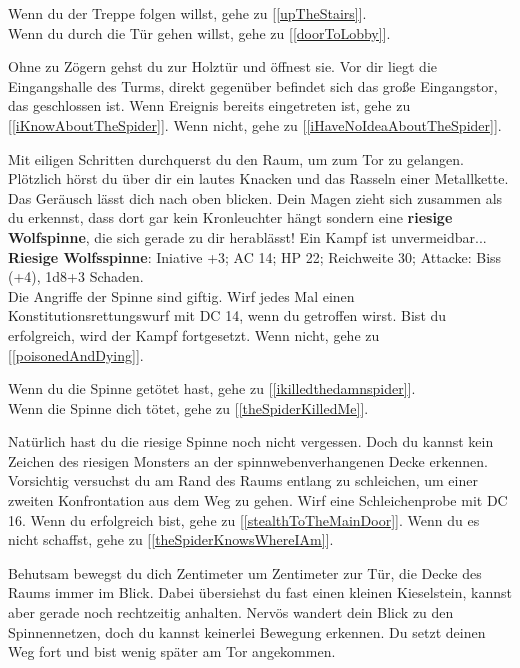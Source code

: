Wenn du der Treppe folgen willst, gehe zu [\ref{upTheStairs}].
\\Wenn du durch die Tür gehen willst, gehe zu [\ref{doorToLobby}].


Ohne zu Zögern gehst du zur Holztür und öffnest sie. Vor dir liegt die Eingangshalle des Turms, direkt gegenüber befindet sich das große Eingangstor, das geschlossen ist. Wenn Ereignis  bereits eingetreten ist, gehe zu [\ref{iKnowAboutTheSpider}].
Wenn nicht, gehe zu [\ref{iHaveNoIdeaAboutTheSpider}].


Mit eiligen Schritten durchquerst du den Raum, um zum Tor zu gelangen. Plötzlich hörst du über dir ein lautes Knacken und das Rasseln einer Metallkette.
Das Geräusch lässt dich nach oben blicken. Dein Magen zieht sich zusammen als du erkennst, dass dort gar kein Kronleuchter hängt sondern eine \textbf{riesige Wolfspinne}, die sich gerade zu dir herablässt! Ein Kampf ist unvermeidbar...\\

\textbf{Riesige Wolfsspinne}: Iniative +3;
AC 14;
HP 22;
Reichweite 30;
Attacke: Biss (+4), 1d8+3 Schaden.\\

Die Angriffe der Spinne sind giftig. Wirf jedes Mal einen Konstitutionsrettungswurf mit
DC 14, wenn du getroffen wirst. Bist du erfolgreich, wird der Kampf fortgesetzt.
Wenn nicht, gehe zu [\ref{poisonedAndDying}].

Wenn du die Spinne getötet hast, gehe zu [\ref{ikilledthedamnspider}].
\\Wenn die Spinne dich tötet, gehe zu [\ref{theSpiderKilledMe}].


Natürlich hast du die riesige Spinne noch nicht vergessen. Doch du kannst kein Zeichen des riesigen Monsters an der spinnwebenverhangenen Decke erkennen. Vorsichtig versuchst du am Rand des Raums entlang zu schleichen, um einer zweiten Konfrontation aus dem Weg zu gehen. Wirf eine Schleichenprobe mit DC 16. Wenn du erfolgreich bist, gehe zu [\ref{stealthToTheMainDoor}].
Wenn du es nicht schaffst, gehe zu [\ref{theSpiderKnowsWhereIAm}].


Behutsam bewegst du dich Zentimeter um Zentimeter zur Tür, die Decke des Raums immer im Blick. Dabei übersiehst du fast einen kleinen Kieselstein, kannst aber gerade noch rechtzeitig anhalten. Nervös wandert dein Blick zu den Spinnennetzen, doch du kannst keinerlei Bewegung erkennen.
Du setzt deinen Weg fort und bist wenig später am Tor angekommen.

